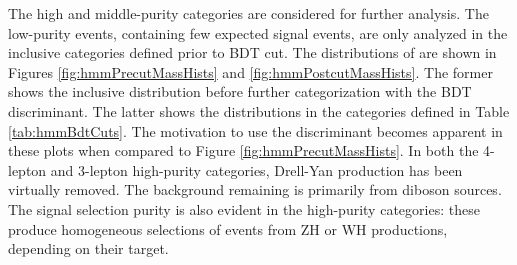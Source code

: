 The high and middle-purity categories are considered for further analysis.
The low-purity events, containing few expected signal events, are only analyzed in the inclusive categories defined prior to BDT cut.
The distributions of \muu are shown in Figures \ref{fig:hmmPrecutMassHists} and \ref{fig:hmmPostcutMassHists}.
The former shows the inclusive distribution before further categorization with the BDT discriminant.
The latter shows the distributions in the categories defined in Table \ref{tab:hmmBdtCuts}.
The motivation to use the discriminant becomes apparent in these plots when compared to Figure \ref{fig:hmmPrecutMassHists}.
In both the 4-lepton and 3-lepton high-purity categories, Drell-Yan production has been virtually removed.
The background remaining is primarily from diboson sources.
The signal selection purity is also evident in the high-purity categories: these produce homogeneous selections of events from ZH or WH productions, depending on their target.

